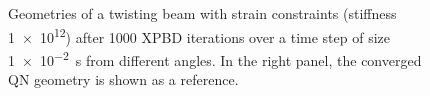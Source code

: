 \begin{figure}[tb]
    \caption{Geometries of a twisting beam with strain constraints (stiffness \num{1e12}) after 1000 XPBD iterations over a time step of size \SI{1e-2}{\second} 
    from different angles. In the right panel, the converged QN geometry is shown as a reference.}
    \label{fig:twisting-beam-xpbd-failure-geometry}
\end{figure}

